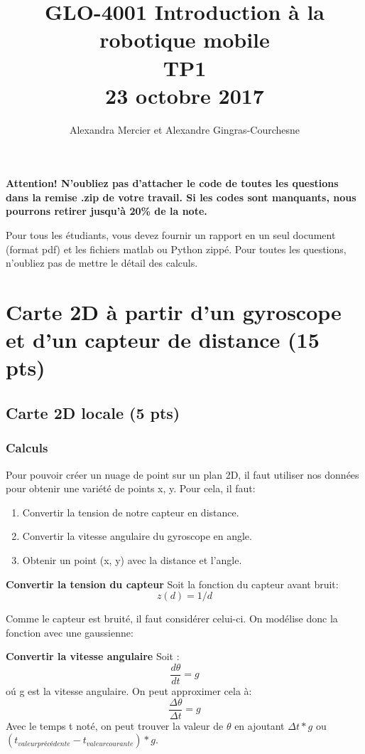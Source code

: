 \documentclass[12pt]{article}
\begin{document}
\title{GLO-4001 Introduction à la robotique mobile \\  TP1 \\ 23 octobre 2017}
\author{Alexandra Mercier et Alexandre Gingras-Courchesne}
\maketitle


{\bf Attention! N'oubliez pas d'attacher le code de toutes les questions dans la remise .zip de votre travail. Si les codes sont manquants, nous pourrons retirer jusqu'à 20\% de la note. }

Pour tous les étudiants, vous devez fournir un rapport en un seul document (format pdf) et les fichiers matlab ou Python zippé. Pour toutes les questions, n'oubliez pas de mettre le détail des calculs.

\section{Carte 2D à partir d'un gyroscope et d'un capteur de distance (15 pts)}

\subsection{Carte 2D locale (5 pts)}
\label{CarteLocale}

\subsubsection{Calculs}
Pour pouvoir créer un nuage de point sur un plan 2D, il faut utiliser nos données pour obtenir une variété de points x, y.
Pour cela, il faut:
\begin{enumerate}
        \item Convertir la tension de notre capteur en distance.
        \item Convertir la vitesse angulaire du gyroscope en angle.
        \item Obtenir un point (x, y) avec la distance et l'angle.
\end{enumerate}

\textbf{Convertir la tension du capteur}
Soit la fonction du capteur avant bruit:
\[ z(d) = 1/d \]

Comme le capteur est bruité, il faut consid\'erer celui-ci. On mod\'elise donc la fonction avec une gaussienne:

\textbf{Convertir la vitesse angulaire}
Soit :
\[ \frac{d\theta}{dt} = g \] o\'u g est la vitesse angulaire.
On peut approximer cela \`a:
\[ \frac{\Delta \theta}{\Delta t}  = g\]
Avec le temps t noté, on peut trouver la valeur de $\theta$ en ajoutant $\Delta t * g $ ou $ (t_{valeur précédente} - t_{valeur courante}) * g$.
\end{document}
